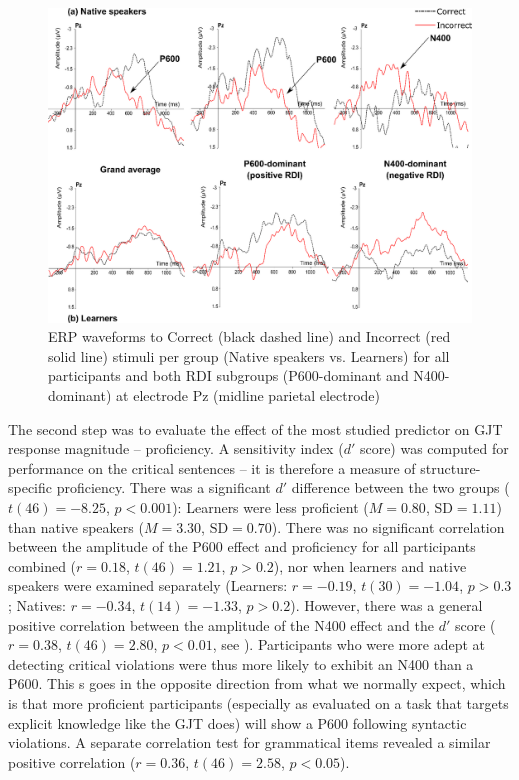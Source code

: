 \documentclass[output=paper,colorlinks,citecolor=brown,modfonts,nonflat]{../langscibook}
\begin{document}
\begin{figure}
\includegraphics[width=\textwidth]{figures/pelissier-img002.png}
\caption{ERP  waveforms  to  Correct  (black  dashed  line)  and  Incorrect  (red  solid  line)  stimuli  per  group  (Native  speakers  vs.  Learners)  for  all  participants  and  both  RDI  subgroups  (P600-dominant  and  N400-dominant)  at  electrode  Pz  (midline  parietal  electrode)\label{fig:pelissier:2}}
\end{figure}

The second step was to evaluate the effect of the most studied predictor on GJT response magnitude – proficiency. A sensitivity index ($d′$ score) was computed for performance on the critical sentences – it is therefore a measure of structure-specific proficiency. There was a significant $d′$ difference between the two groups ($t(46) = -8.25$, $p < 0.001$): Learners were less proficient ($M = 0.80$, $\text{SD} = 1.11$) than native speakers ($M = 3.30$, $\text{SD} = 0.70$). There was no significant correlation between the amplitude of the P600 effect and proficiency for all participants combined ($r = 0.18$, $t(46) = 1.21$, $p > 0.2$), nor when learners and native speakers were examined separately (Learners: $r = -0.19$, $t(30) = -1.04$, $p > 0.3$; Natives: $r = -0.34$, $t(14) = -1.33$, $p > 0.2$). However, there was a general positive correlation between the amplitude of the N400 effect and the $d′$ score ($r = 0.38$, $t(46) = 2.80$, $p <  0.01$, see ). Participants who were more adept at detecting critical violations were thus more likely to exhibit an N400 than a P600. This s goes in the opposite direction from what we normally expect, which is that more proficient participants (especially as evaluated on a task that targets explicit knowledge like the GJT does) will show a P600 following syntactic violations. A separate correlation test for grammatical items revealed a similar positive correlation ($r = 0.36$, $t(46) = 2.58$, $p <  0.05$). 
\end{document}
